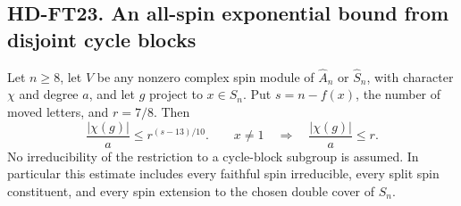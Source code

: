 \subsection*{HD-FT23. An all-spin exponential bound from disjoint cycle blocks}

\begin{lemma}[HD-FT23]
Let $n\ge8$, let $V$ be any nonzero complex spin module of
$\widehat A_n$ or $\widehat S_n$, with character $\chi$ and degree $a$,
and let $g$ project to $x\in S_n$.  Put $s=n-f(x)$, the number of
moved letters, and $r=7/8$.  Then
\[
 \frac{|\chi(g)|}{a}\le r^{(s-13)/10}.
 \qquad
 x\ne1\quad\Longrightarrow\quad\frac{|\chi(g)|}{a}\le r.
 \tag{SPA.2}
\]
No irreducibility of the restriction to a cycle-block subgroup is
assumed.  In particular this estimate includes every faithful spin
irreducible, every split spin constituent, and every spin extension
to the chosen double cover of $S_n$.
\end{lemma}


